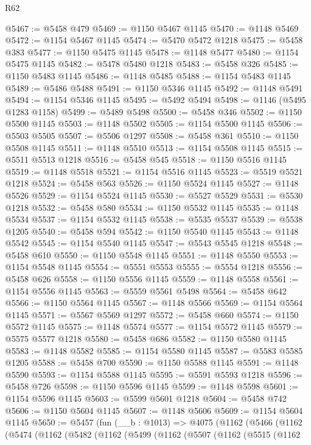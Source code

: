 \begin{lexlean}{R62}
\begin{coremodule}
@5467 := @5458 @479
@5469 := @1150 @5467 @1145
@5470 := @1148 @5469
@5472 := @1154 @5467 @1145
@5474 := @5470 @5472 @1218
@5475 := @5458 @383
@5477 := @1150 @5475 @1145
@5478 := @1148 @5477
@5480 := @1154 @5475 @1145
@5482 := @5478 @5480 @1218
@5483 := @5458 @326
@5485 := @1150 @5483 @1145
@5486 := @1148 @5485
@5488 := @1154 @5483 @1145
@5489 := @5486 @5488
@5491 := @1150 @5346 @1145
@5492 := @1148 @5491
@5494 := @1154 @5346 @1145
@5495 := @5492 @5494
@5498 := @1146 (@5495 @1283 @1158)
@5499 := @5489 @5498
@5500 := @5458 @346
@5502 := @1150 @5500 @1145
@5503 := @1148 @5502
@5505 := @1154 @5500 @1145
@5506 := @5503 @5505
@5507 := @5506 @1297
@5508 := @5458 @361
@5510 := @1150 @5508 @1145
@5511 := @1148 @5510
@5513 := @1154 @5508 @1145
@5515 := @5511 @5513 @1218
@5516 := @5458 @545
@5518 := @1150 @5516 @1145
@5519 := @1148 @5518
@5521 := @1154 @5516 @1145
@5523 := @5519 @5521 @1218
@5524 := @5458 @563
@5526 := @1150 @5524 @1145
@5527 := @1148 @5526
@5529 := @1154 @5524 @1145
@5530 := @5527 @5529
@5531 := @5530 @1218
@5532 := @5458 @580
@5534 := @1150 @5532 @1145
@5535 := @1148 @5534
@5537 := @1154 @5532 @1145
@5538 := @5535 @5537
@5539 := @5538 @1205
@5540 := @5458 @594
@5542 := @1150 @5540 @1145
@5543 := @1148 @5542
@5545 := @1154 @5540 @1145
@5547 := @5543 @5545 @1218
@5548 := @5458 @610
@5550 := @1150 @5548 @1145
@5551 := @1148 @5550
@5553 := @1154 @5548 @1145
@5554 := @5551 @5553
@5555 := @5554 @1218
@5556 := @5458 @626
@5558 := @1150 @5556 @1145
@5559 := @1148 @5558
@5561 := @1154 @5556 @1145
@5563 := @5559 @5561 @5498
@5564 := @5458 @642
@5566 := @1150 @5564 @1145
@5567 := @1148 @5566
@5569 := @1154 @5564 @1145
@5571 := @5567 @5569 @1297
@5572 := @5458 @660
@5574 := @1150 @5572 @1145
@5575 := @1148 @5574
@5577 := @1154 @5572 @1145
@5579 := @5575 @5577 @1218
@5580 := @5458 @686
@5582 := @1150 @5580 @1145
@5583 := @1148 @5582
@5585 := @1154 @5580 @1145
@5587 := @5583 @5585 @1205
@5588 := @5458 @700
@5590 := @1150 @5588 @1145
@5591 := @1148 @5590
@5593 := @1154 @5588 @1145
@5595 := @5591 @5593 @1218
@5596 := @5458 @726
@5598 := @1150 @5596 @1145
@5599 := @1148 @5598
@5601 := @1154 @5596 @1145
@5603 := @5599 @5601 @1218
@5604 := @5458 @742
@5606 := @1150 @5604 @1145
@5607 := @1148 @5606
@5609 := @1154 @5604 @1145
@5650 := @5457
    (fun (__b : @1013) =>
    @4075
      (@1162
        (@5466
          (@1162
            (@5474
              (@1162
                (@5482
                  (@1162
                    (@5499
                      (@1162
                        (@5507
                          (@1162
                            (@5515
                              (@1162

\end{coremodule}
\end{lexlean}
